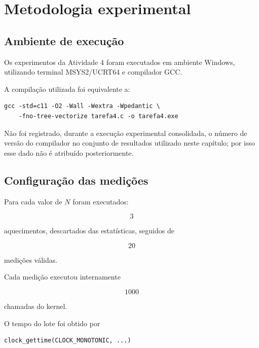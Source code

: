 \section{Metodologia experimental}

\label{sec:atvd04-metodologia}

\subsection{Ambiente de execução}

Os experimentos da Atividade 4 foram executados em ambiente Windows,
utilizando terminal MSYS2/UCRT64 e compilador GCC.

A compilação utilizada foi equivalente a:

\begin{verbatim}
gcc -std=c11 -O2 -Wall -Wextra -Wpedantic \
    -fno-tree-vectorize tarefa4.c -o tarefa4.exe
\end{verbatim}

Não foi registrado, durante a execução experimental consolidada, o número
de versão do compilador no conjunto de resultados utilizado neste capítulo;
por isso esse dado não é atribuído posteriormente.

\subsection{Configuração das medições}

Para cada valor de \(N\) foram executados:

\begin{equation}
    3
\end{equation}

aquecimentos, descartados das estatísticas, seguidos de

\begin{equation}
    20
\end{equation}

medições válidas.

Cada medição executou internamente

\begin{equation}
    1000
\end{equation}

chamadas do kernel.

O tempo do lote foi obtido por

\begin{verbatim}
clock_gettime(CLOCK_MONOTONIC, ...)
\end{verbatim}

